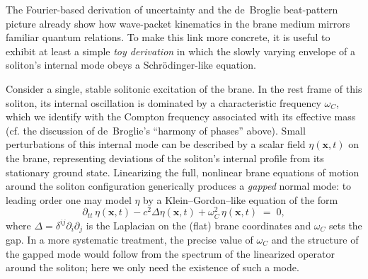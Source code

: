 The Fourier-based derivation of uncertainty and the de~Broglie
beat-pattern picture already show how wave-packet kinematics in the
brane medium mirrors familiar quantum relations. To make this link more
concrete, it is useful to exhibit at least a simple \emph{toy
derivation} in which the slowly varying envelope of a soliton's internal
mode obeys a Schrödinger-like equation.

Consider a single, stable solitonic excitation of the brane. In the
rest frame of this soliton, its internal oscillation is dominated by a
characteristic frequency $\omega_C$, which we identify with the Compton
frequency associated with its effective mass (cf. the discussion of
de~Broglie's ``harmony of phases'' above). Small perturbations of this
internal mode can be described by a scalar field
$\eta(\mathbf x,t)$ on the brane, representing deviations of the
soliton's internal profile from its stationary ground state. Linearizing
the full, nonlinear brane equations of motion around the soliton
configuration generically produces a \emph{gapped} normal mode:
to leading order one may model $\eta$ by a Klein--Gordon--like equation
of the form
\begin{equation}
  \partial_{tt}\,\eta(\mathbf x,t)
  - c^2 \Delta \eta(\mathbf x,t)
  + \omega_C^2\,\eta(\mathbf x,t) \;=\; 0,
  \label{eq:toy-KG}
\end{equation}
where $\Delta = \delta^{ij}\partial_i\partial_j$ is the Laplacian on the
(flat) brane coordinates and $\omega_C$ sets the gap. In a more
systematic treatment, the precise value of $\omega_C$ and the structure
of the gapped mode would follow from the spectrum of the linearized
operator around the soliton; here we only need the existence of such a
mode.

